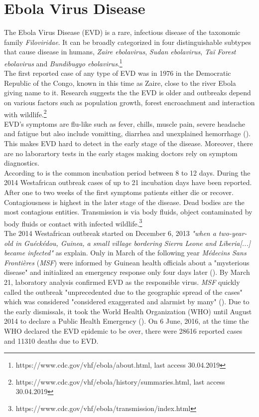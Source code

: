 \documentclass{article}
\begin{document}
\section{Ebola Virus Disease}
The Ebola Virus Disease (EVD) is a rare, infectious disease of the taxonomic family \textit{Filoviridae}. It can be broadly categorized in four distinguishable subtypes that cause disease in humans, \textit{Zaire ebolavirus}, \textit{Sudan ebolavirus}, \textit{Ta\"{i} Forest ebolavirus} and \textit{Bundibugyo ebolavirus}.\footnote{https://www.cdc.gov/vhf/ebola/about.html, last access 30.04.2019} \\
The first reported case of any type of EVD was in 1976 in the Democratic Republic of the Congo, known in this time as Zaire, close to the river Ebola giving name to it. Research suggests the the EVD is older and outbreaks depend on various factors such as population growth, forest encroachment and interaction with wildlife.\footnote{https://www.cdc.gov/vhf/ebola/history/summaries.html, last access 30.04.2019} \\
EVD's symptoms are flu-like such as fever, chills, muscle pain, severe headache and fatigue but also include vomitting, diarrhea and unexplained hemorrhage (\cite{goeijenbier2014ebola}). This makes EVD hard to detect in the early stage of the disease. Moreover, there are no laborartory tests in the early stages making doctors rely on symptom diagnostics. \\
According to \cite{van2015review} is the common incubation period between  
8 to 12 days. During the 2014 Westafrican outbreak cases of up to 21 incubation days have been reported. After one to two weeks of the first symptoms patients either die or recover. Contagiousness is highest in the later stage of the disease. Dead bodies are the most contagious entities. Transmission is via body fluids, object contaminated by body fluids or contact with infected wildlife.\footnote{https://www.cdc.gov/vhf/ebola/transmission/index.html} \\
The 2014 Westafrican outbreak started on December 6, 2013 \textit{"when a two-year-old in Gu\'{e}ck\'{e}dou, Guinea, a small village bordering Sierra Leone and Liberia[...] became infected"} as \cite{alexander2015factors} explain. Only in March of the following year 
\textit{M\'{e}decins Sans Fronti\`{e}res} (\textit{MSF}) were informed by Guinean health officials about a "mysterious disease" and initialized an emergency response only four days later (\cite{frontieres2015pushed}). By March 21, laboratory analysis confirmed EVD as the responsible virus. \textit{MSF} quickly called the outbreak "unprecedented due to the geographic spread of the cases" which was considered "considered exaggerated and alarmist by many" (\cite{frontieres2015pushed}). Due to the early dismissals, it took the World Health Organization (WHO) until August 2014 to declare a Public Health Emergency (\cite{ravi2019review}). On 6 June, 2016, at the time the WHO declared the EVD epidemic to be over, there were 28616 reported cases and 11310 deaths due to EVD.\\
\end{document}
